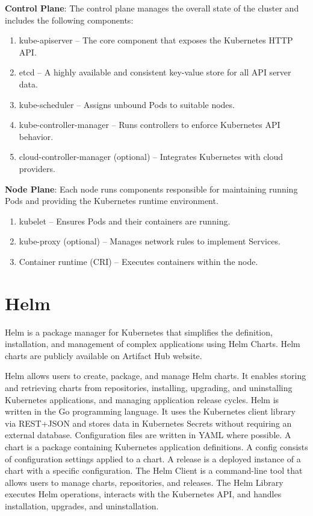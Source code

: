 \documentclass[../main.tex]{subfiles}
\begin{document}

\textbf{Control Plane}: The control plane manages the overall state of the cluster and includes the following components:  

\begin{enumerate}
    \item[] kube-apiserver – The core component that exposes the Kubernetes HTTP API.
    \item[] etcd – A highly available and consistent key-value store for all API server data.  
    \item[] kube-scheduler – Assigns unbound Pods to suitable nodes.  
    \item[] kube-controller-manager – Runs controllers to enforce Kubernetes API behavior.  
    \item[] cloud-controller-manager (optional) – Integrates Kubernetes with cloud providers.  
\end{enumerate}

\textbf{Node Plane}: Each node runs components responsible for maintaining running Pods and providing the Kubernetes runtime environment.

\begin{enumerate}
    \item[] kubelet – Ensures Pods and their containers are running.  
    \item[] kube-proxy (optional) – Manages network rules to implement Services.  
    \item[] Container runtime (CRI) – Executes containers within the node.
\end{enumerate}

\section{Helm}

Helm is a package manager for Kubernetes that simplifies the definition, installation, and management of complex applications using Helm Charts. Helm charts are publicly available on Artifact Hub website. \cite{helm} 

Helm allows users to create, package, and manage Helm charts. It enables storing and retrieving charts from repositories, installing, upgrading, and uninstalling Kubernetes applications, and managing application release cycles. Helm is written in the Go programming language. It uses the Kubernetes client library via REST+JSON and stores data in Kubernetes Secrets without requiring an external database. Configuration files are written in YAML where possible. A chart is a package containing Kubernetes application definitions. A config consists of configuration settings applied to a chart. A release is a deployed instance of a chart with a specific configuration. The Helm Client is a command-line tool that allows users to manage charts, repositories, and releases. The Helm Library executes Helm operations, interacts with the Kubernetes API, and handles installation, upgrades, and uninstallation. \cite{helmarchitecture}
\end{document}
